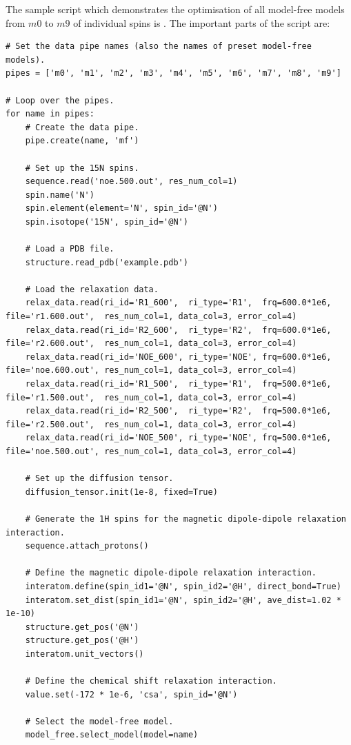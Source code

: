 \begin{htmlonly}
\begin{htmlonly}
The sample script which demonstrates the optimisation of all model-free models from $m0$ to $m9$ of individual spins is .  The important parts of the script are:

\begin{lstlisting}
# Set the data pipe names (also the names of preset model-free models).
pipes = ['m0', 'm1', 'm2', 'm3', 'm4', 'm5', 'm6', 'm7', 'm8', 'm9']

# Loop over the pipes.
for name in pipes:
    # Create the data pipe.
    pipe.create(name, 'mf')
    
    # Set up the 15N spins.
    sequence.read('noe.500.out', res_num_col=1)
    spin.name('N')
    spin.element(element='N', spin_id='@N')
    spin.isotope('15N', spin_id='@N')
    
    # Load a PDB file.
    structure.read_pdb('example.pdb')
    
    # Load the relaxation data.
    relax_data.read(ri_id='R1_600',  ri_type='R1',  frq=600.0*1e6, file='r1.600.out',  res_num_col=1, data_col=3, error_col=4)
    relax_data.read(ri_id='R2_600',  ri_type='R2',  frq=600.0*1e6, file='r2.600.out',  res_num_col=1, data_col=3, error_col=4)
    relax_data.read(ri_id='NOE_600', ri_type='NOE', frq=600.0*1e6, file='noe.600.out', res_num_col=1, data_col=3, error_col=4)
    relax_data.read(ri_id='R1_500',  ri_type='R1',  frq=500.0*1e6, file='r1.500.out',  res_num_col=1, data_col=3, error_col=4)
    relax_data.read(ri_id='R2_500',  ri_type='R2',  frq=500.0*1e6, file='r2.500.out',  res_num_col=1, data_col=3, error_col=4)
    relax_data.read(ri_id='NOE_500', ri_type='NOE', frq=500.0*1e6, file='noe.500.out', res_num_col=1, data_col=3, error_col=4)
    
    # Set up the diffusion tensor.
    diffusion_tensor.init(1e-8, fixed=True)
    
    # Generate the 1H spins for the magnetic dipole-dipole relaxation interaction.
    sequence.attach_protons()
    
    # Define the magnetic dipole-dipole relaxation interaction.
    interatom.define(spin_id1='@N', spin_id2='@H', direct_bond=True)
    interatom.set_dist(spin_id1='@N', spin_id2='@H', ave_dist=1.02 * 1e-10)
    structure.get_pos('@N')
    structure.get_pos('@H')
    interatom.unit_vectors()
    
    # Define the chemical shift relaxation interaction.
    value.set(-172 * 1e-6, 'csa', spin_id='@N')
    
    # Select the model-free model.
    model_free.select_model(model=name)
    

\end{lstlisting}
\end{htmlonly}
\end{htmlonly}
